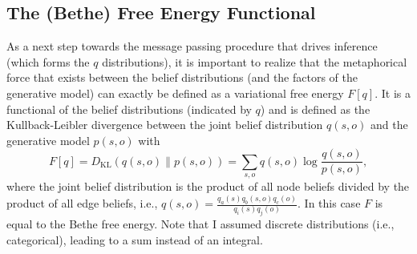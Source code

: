 \subsection{The (Bethe) Free Energy Functional}

As a next step towards the message passing procedure that drives inference (which forms the \(q\) distributions), it is important to realize that the metaphorical force that exists between the belief distributions (and the factors of the generative model) can exactly be defined as a variational free energy \(F[q]\). It is a functional of the belief distributions (indicated by \(q\)) and is defined as the Kullback-Leibler divergence between the joint belief distribution \(q(s,o)\) and the generative model \(p(s,o)\) with
\begin{equation}
    F[q] = D_{\mathrm{KL}}(q(s,o) \parallel p(s,o)) = \sum_{s,o} q(s,o) \log \frac{q(s,o)}{p(s,o)},
\end{equation}
where the joint belief distribution is the product of all node beliefs divided by the product of all edge beliefs, i.e., \(q(s,o)=\frac{q_a(s)q_b(s,o)q_c(o)}{q_i(s)q_j(o)}\). In this case \(F\) is equal to the Bethe free energy. Note that I assumed discrete distributions (i.e., categorical), leading to a sum instead of an integral.

